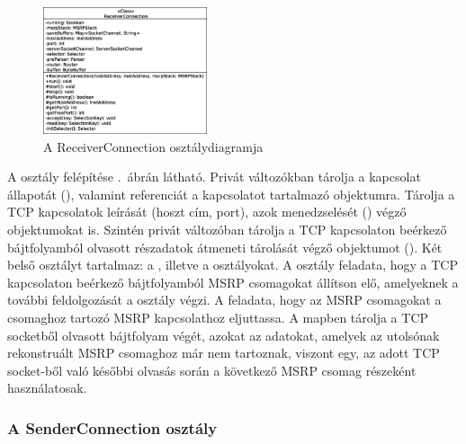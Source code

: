 \begin{figure}
  \vspace{-15pt}
  \begin{center}
    \includegraphics[width=0.43\textwidth]{img/class_diagrams/ReceiverConnection.eps}
  \end{center}
  \vspace{-15pt}
  \captionsetup{font=scriptsize}
  \caption{A ReceiverConnection osztálydiagramja}
   \label{fig:class_receiverconnection}
  \vspace{-10pt}
\end{figure}
A osztály felépítése .~ábrán látható. Privát változókban tárolja a kapcsolat állapotát (), valamint referenciát a kapcsolatot tartalmazó  objektumra. Tárolja a TCP kapcsolatok leírását (hoszt cím, port), azok menedzselését () végző objektumokat is. Szintén privát változóban tárolja a TCP kapcsolaton beérkező bájtfolyamból olvasott részadatok átmeneti tárolását végző objektumot (). Két belső osztályt tartalmaz: a , illetve a  osztályokat. A  osztály feladata, hogy a TCP kapcsolaton beérkező bájtfolyamból MSRP csomagokat állítson elő, amelyeknek a további feldolgozását a  osztály végzi. A  feladata, hogy az MSRP csomagokat a csomaghoz tartozó MSRP kapcsolathoz eljuttassa. A  mapben tárolja a TCP socketből olvasott bájtfolyam végét, azokat az adatokat, amelyek az utolsónak rekonstruált MSRP csomaghoz már nem tartoznak, viszont egy, az adott TCP socket-ből való későbbi olvasás során a következő MSRP csomag részeként használatosak.

\subsubsection*{A SenderConnection osztály}
\label{sec:msrp_senderconnection}

